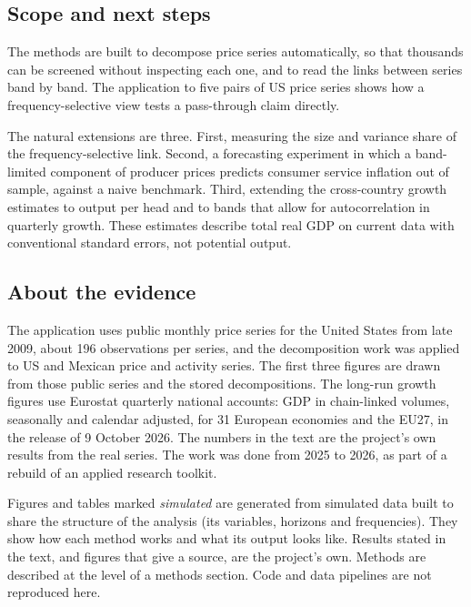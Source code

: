 \documentclass[
  british,
  a4paper,
]{article}
\begin{document}
\subsection{Scope and next steps}\label{scope-and-next-steps}

The methods are built to decompose price series automatically, so that
thousands can be screened without inspecting each one, and to read the
links between series band by band. The application to five pairs of US
price series shows how a frequency-selective view tests a pass-through
claim directly.

The natural extensions are three. First, measuring the size and variance
share of the frequency-selective link. Second, a forecasting experiment
in which a band-limited component of producer prices predicts consumer
service inflation out of sample, against a naive benchmark. Third,
extending the cross-country growth estimates to output per head and to
bands that allow for autocorrelation in quarterly growth. These
estimates describe total real GDP on current data with conventional
standard errors, not potential output.

\subsection{About the evidence}\label{about-the-evidence}

The application uses public monthly price series for the United States
from late 2009, about 196 observations per series, and the decomposition
work was applied to US and Mexican price and activity series. The first
three figures are drawn from those public series and the stored
decompositions. The long-run growth figures use Eurostat quarterly
national accounts: GDP in chain-linked volumes, seasonally and calendar
adjusted, for 31 European economies and the EU27, in the release of 9
October 2026. The numbers in the text are the project's own results from
the real series. The work was done from 2025 to 2026, as part of a
rebuild of an applied research toolkit.

Figures and tables marked \emph{simulated} are generated from simulated
data built to share the structure of the analysis (its variables,
horizons and frequencies). They show how each method works and what its
output looks like. Results stated in the text, and figures that give a
source, are the project's own. Methods are described at the level of a
methods section. Code and data pipelines are not reproduced here.
\end{document}
